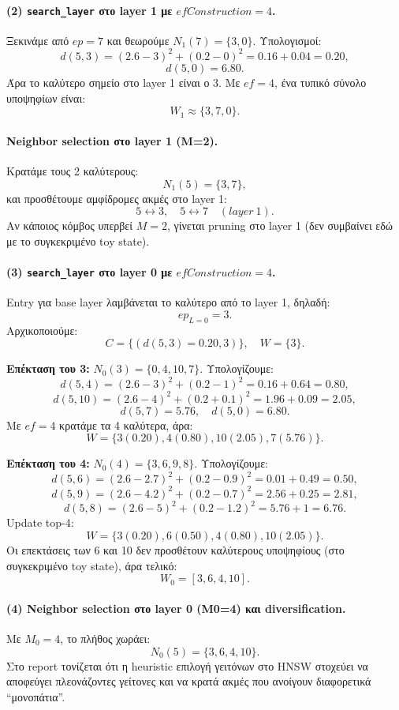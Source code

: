\documentclass[12pt,a4paper]{article}
\begin{document}
\paragraph{(2) \texttt{search\_layer} στο layer 1 με $efConstruction=4$.}
Ξεκινάμε από $ep=7$ και θεωρούμε $N_1(7)=\{3,0\}$.
Υπολογισμοί:
\[
d(5,3)=(2.6-3)^2+(0.2-0)^2=0.16+0.04=0.20,
\]
\[
d(5,0)=6.80.
\]
Άρα το καλύτερο σημείο στο layer 1 είναι ο 3. Με $ef=4$, ένα τυπικό σύνολο υποψηφίων είναι:
\[
W_1 \approx \{3,7,0\}.
\]

\paragraph{Neighbor selection στο layer 1 (M=2).}
Κρατάμε τους 2 καλύτερους:
\[
N_1(5)=\{3,7\},
\]
και προσθέτουμε αμφίδρομες ακμές στο layer 1:
\[
5\leftrightarrow 3,\quad 5\leftrightarrow 7 \quad (layer~1).
\]
Αν κάποιος κόμβος υπερβεί $M=2$, γίνεται pruning στο layer 1 (δεν συμβαίνει εδώ με το συγκεκριμένο toy state).

\paragraph{(3) \texttt{search\_layer} στο layer 0 με $efConstruction=4$.}
Entry για base layer λαμβάνεται το καλύτερο από το layer 1, δηλαδή:
\[
ep_{L=0}=3.
\]
Αρχικοποιούμε:
\[
C=\{(d(5,3)=0.20,3)\},\quad W=\{3\}.
\]

\textbf{Επέκταση του 3:} $N_0(3)=\{0,4,10,7\}$.
Υπολογίζουμε:
\[
d(5,4)=(2.6-3)^2+(0.2-1)^2=0.16+0.64=0.80,
\]
\[
d(5,10)=(2.6-4)^2+(0.2+0.1)^2=1.96+0.09=2.05,
\]
\[
d(5,7)=5.76,\quad d(5,0)=6.80.
\]
Με $ef=4$ κρατάμε τα 4 καλύτερα, άρα:
\[
W=\{3(0.20),4(0.80),10(2.05),7(5.76)\}.
\]

\textbf{Επέκταση του 4:} $N_0(4)=\{3,6,9,8\}$.
Υπολογίζουμε:
\[
d(5,6)=(2.6-2.7)^2+(0.2-0.9)^2=0.01+0.49=0.50,
\]
\[
d(5,9)=(2.6-4.2)^2+(0.2-0.7)^2=2.56+0.25=2.81,
\]
\[
d(5,8)=(2.6-5)^2+(0.2-1.2)^2=5.76+1=6.76.
\]
Update top-4:
\[
W=\{3(0.20),6(0.50),4(0.80),10(2.05)\}.
\]
Οι επεκτάσεις των 6 και 10 δεν προσθέτουν καλύτερους υποψηφίους (στο συγκεκριμένο toy state),
άρα τελικό:
\[
W_0=[3,6,4,10].
\]

\paragraph{(4) Neighbor selection στο layer 0 (M0=4) και diversification.}
Με $M_0=4$, το πλήθος χωράει:
\[
N_0(5)=\{3,6,4,10\}.
\]
Στο report τονίζεται ότι η heuristic επιλογή γειτόνων στο HNSW στοχεύει να αποφεύγει πλεονάζοντες γείτονες
και να κρατά ακμές που ανοίγουν διαφορετικά ``μονοπάτια''.
\end{document}
